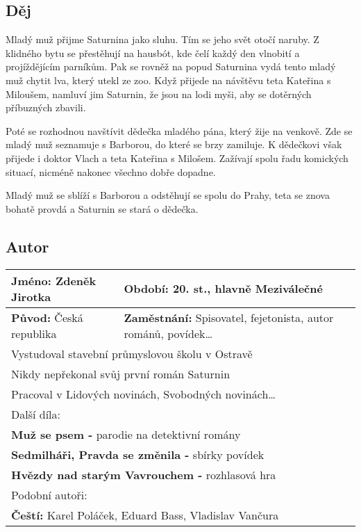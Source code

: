\subsection*{Děj}
Mladý muž přijme Saturnina jako sluhu.
Tím se jeho svět otočí naruby.
Z klidného bytu se přestěhují na hausbót, kde čelí každý den vlnobití a projíždějícím parníkům.
Pak se rovněž na popud Saturnina vydá tento mladý muž chytit lva, který utekl ze zoo.
Když přijede na návštěvu teta Kateřina s Miloušem, namluví jim Saturnin, že jsou na lodi myši, aby se dotěrných příbuzných zbavili.

Poté se rozhodnou navštívit dědečka mladého pána, který žije na venkově.
Zde se mladý muž seznamuje s Barborou, do které se brzy zamiluje.
K dědečkovi však přijede i doktor Vlach a teta Kateřina s Milošem.
Zažívají spolu řadu komických situací, nicméně nakonec všechno dobře dopadne.

Mladý muž se sblíží s Barborou a odstěhují se spolu do Prahy, teta se znova bohatě provdá a Saturnin se stará o dědečka.

\subsection*{Autor}
\begin{tabularx}{\linewidth}{l|l}
    \textbf{Jméno:} Zdeněk Jirotka  & \textbf{Období:} 20. st., hlavně Meziválečné                             \\
    \hline
    \textbf{Původ:} Česká republika & \textbf{Zaměstnání:} Spisovatel, fejetonista, autor románů, povídek\dots \\
    \hline
    \multicolumn{2}{l}{Vystudoval stavební průmyslovou školu v Ostravě}                                        \\
    \multicolumn{2}{l}{Nikdy nepřekonal svůj první román Saturnin}                                             \\
    \multicolumn{2}{l}{Pracoval v Lidových novinách, Svobodných novinách\dots}                                 \\
    \hline
    \multicolumn{2}{l}{Další díla:}                                                                            \\
    \multicolumn{2}{l}{\textbf{Muž se psem -} parodie na detektivní romány}                                    \\
    \multicolumn{2}{l}{\textbf{Sedmilháři, Pravda se změnila -} sbírky povídek}                                \\
    \multicolumn{2}{l}{\textbf{Hvězdy nad starým Vavrouchem -} rozhlasová hra}                                 \\
    \hline
    \multicolumn{2}{l}{Podobní autoři:}                                                                        \\
    \multicolumn{2}{l}{\textbf{Čeští:} Karel Poláček, Eduard Bass, Vladislav Vančura}                          \\
\end{tabularx}
